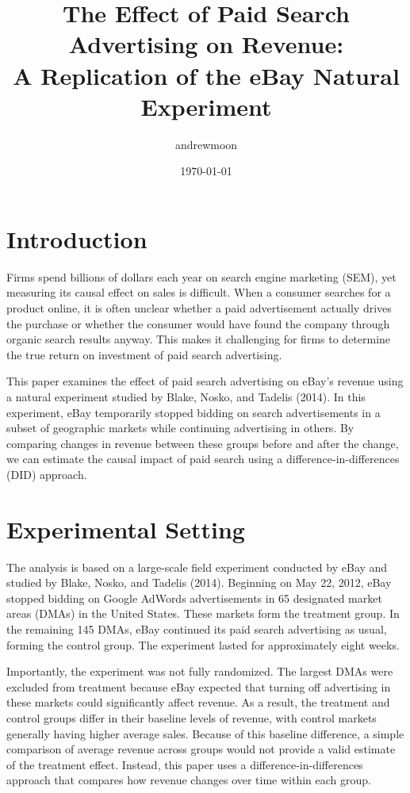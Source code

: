 \documentclass[12pt]{article}
\title{The Effect of Paid Search Advertising on Revenue: \\
A Replication of the eBay Natural Experiment}
\author{andrewmoon}
\date{\today}
\begin{document}
\maketitle
\section{Introduction}

Firms spend billions of dollars each year on search engine marketing (SEM), 
yet measuring its causal effect on sales is difficult. When a consumer searches 
for a product online, it is often unclear whether a paid advertisement actually 
drives the purchase or whether the consumer would have found the company through 
organic search results anyway. This makes it challenging for firms to determine 
the true return on investment of paid search advertising.

This paper examines the effect of paid search advertising on eBay's revenue 
using a natural experiment studied by Blake, Nosko, and Tadelis (2014). 
In this experiment, eBay temporarily stopped bidding on search advertisements 
in a subset of geographic markets while continuing advertising in others. 
By comparing changes in revenue between these groups before and after the change, 
we can estimate the causal impact of paid search using a difference-in-differences (DID) approach.
\section{Experimental Setting}

The analysis is based on a large-scale field experiment conducted by eBay and studied 
by Blake, Nosko, and Tadelis (2014). Beginning on May 22, 2012, eBay stopped bidding 
on Google AdWords advertisements in 65 designated market areas (DMAs) in the United States. 
These markets form the treatment group. In the remaining 145 DMAs, eBay continued 
its paid search advertising as usual, forming the control group. The experiment lasted 
for approximately eight weeks.

Importantly, the experiment was not fully randomized. The largest DMAs were excluded 
from treatment because eBay expected that turning off advertising in these markets 
could significantly affect revenue. As a result, the treatment and control groups 
differ in their baseline levels of revenue, with control markets generally having 
higher average sales. Because of this baseline difference, a simple comparison of 
average revenue across groups would not provide a valid estimate of the treatment 
effect. Instead, this paper uses a difference-in-differences approach that compares 
how revenue changes over time within each group.
\end{document}

